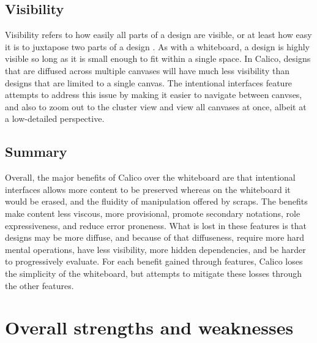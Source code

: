 \subsection{Visibility}

Visibility refers to how easily all parts of a design are visible, or at least how easy it is to juxtapose two parts of a design \cite{Petre2013BookChapter}. As with a whiteboard, a design is highly visible so long as it is small enough to fit within a single space. In Calico, designs that are diffused across multiple canvases will have much less visibility than designs that are limited to a single canvas. The intentional interfaces feature attempts to address this issue by making it easier to navigate between canvses, and also to zoom out to the cluster view and view all canvases at once, albeit at a low-detailed perspective.


\subsection{Summary}

Overall, the major benefits of Calico over the whiteboard are that intentional interfaces allows more content to be preserved whereas on the whiteboard it would be erased, and the fluidity of manipulation offered by scraps. The benefits make content less viscous, more provisional, promote secondary notations, role expressiveness, and reduce error proneness. What is lost in these features is that designs may be more diffuse, and because of that diffuseness, require more hard mental operations, have less visibility, more hidden dependencies, and be harder to progressively evaluate. For each benefit gained through features, Calico loses the simplicity of the whiteboard, but attempts to mitigate these losses through the other features.

\section{Overall strengths and weaknesses}
\label{discussion:overall-strengths-weaknesses}

